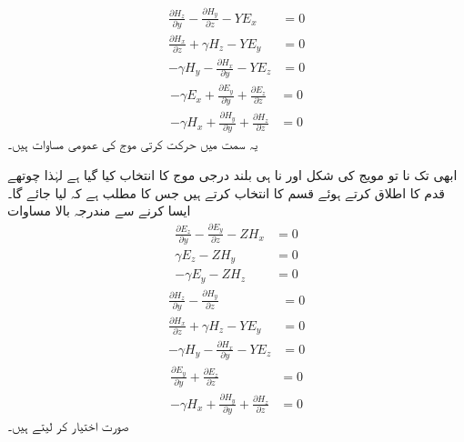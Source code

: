 %
\begin{align}
\frac{\partial H_z}{\partial y}-\frac{\partial H_y}{\partial z}-YE_x&=0 \\
\frac{\partial H_x}{\partial z}+\gamma H_z-YE_y&=0  \\
-\gamma H_y-\frac{\partial H_x}{\partial y}-YE_z&=0 
\end{align}
%
\begin{align}
-\gamma E_x+\frac{\partial E_y}{\partial y}+\frac{\partial E_z}{\partial z}&=0 \\
-\gamma H_x+\frac{\partial H_y}{\partial y}+\frac{\partial H_z}{\partial z}&=0
\end{align}
 یہ  سمت میں حرکت کرتی موج کی عمومی مساوات ہیں۔

ابھی تک نا تو مویج کی شکل اور نا ہی بلند درجی موج  کا انتخاب کیا گیا ہے لہٰذا چوتھے قدم کا اطلاق کرتے ہوئے  قسم کا انتخاب کرتے ہیں جس کا مطلب ہے کہ  لیا جائے گا۔ایسا کرنے سے مندرجہ بالا مساوات   
\begin{align}
\frac{\partial E_z}{\partial y}-\frac{\partial E_y}{\partial z}-Z H_x&=0  \label{مساوات_میوج_الف}\\
\gamma E_z-Z H_y&=0  \label{مساوات_میوج_ب}\\
-\gamma E_y-Z H_z&=0\label{مساوات_میوج_پ}
\end{align}
%
\begin{align}
\frac{\partial H_z}{\partial y}-\frac{\partial H_y}{\partial z}&=0 \label{مساوات_میوج_ت}\\
\frac{\partial H_x}{\partial z}+\gamma H_z-YE_y&=0  \label{مساوات_میوج_ٹ}\\
-\gamma H_y-\frac{\partial H_x}{\partial y}-YE_z&=0 \label{مساوات_میوج_ث}
\end{align}
%
\begin{align}
\frac{\partial E_y}{\partial y}+\frac{\partial E_z}{\partial z}&=0 \label{مساوات_میوج_ج}\\
-\gamma H_x+\frac{\partial H_y}{\partial y}+\frac{\partial H_z}{\partial z}&=0\label{مساوات_میوج_چ}
\end{align}
صورت اختیار کر لیتے ہیں۔

